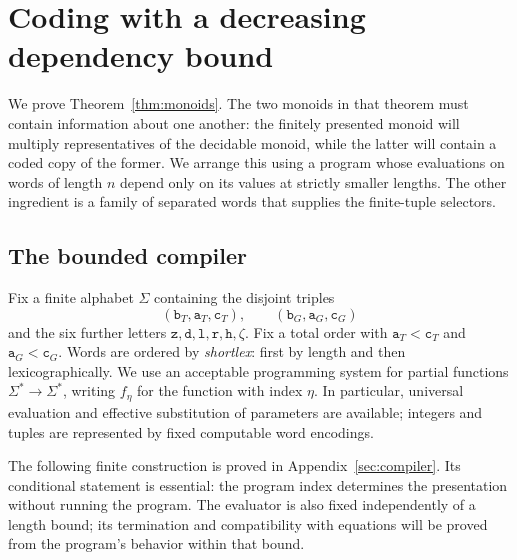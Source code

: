 \section{Coding with a decreasing dependency bound}
\label{sec:bootstrap}

We prove Theorem~\ref{thm:monoids}.  The two monoids in that theorem
must contain information about one another: the finitely presented monoid
will multiply representatives of the decidable monoid, while the latter
will contain a coded copy of the former.  We arrange this using a program
whose evaluations on words of length $n$ depend only on its values at
strictly smaller lengths.  The other ingredient is a family of separated
words that supplies the finite-tuple selectors.

\subsection{The bounded compiler}

Fix a finite alphabet $\Sigma$ containing the disjoint triples
\[
 (\mathtt b_T,\mathtt a_T,\mathtt c_T),\qquad
 (\mathtt b_G,\mathtt a_G,\mathtt c_G)
\]
and the six further letters
$\mathtt z,\mathtt d,\mathtt l,\mathtt r,\mathtt h,\zeta$.
Fix a total order with $\mathtt a_T<\mathtt c_T$ and
$\mathtt a_G<\mathtt c_G$.  Words are ordered by \emph{shortlex}:
first by length and then lexicographically.  We use an acceptable
programming system for partial functions $\Sigma^*\to\Sigma^*$, writing
$f_\eta$ for the function with index $\eta$.  In particular, universal
evaluation and effective substitution of parameters are available;
integers and tuples are represented by fixed computable word encodings.

The following finite construction is proved in
Appendix~\ref{sec:compiler}.  Its conditional statement is essential:
the program index determines the presentation without running the
program. The evaluator is also fixed independently of a length bound;
its termination and compatibility with equations will be proved from
the program's behavior within that bound.

